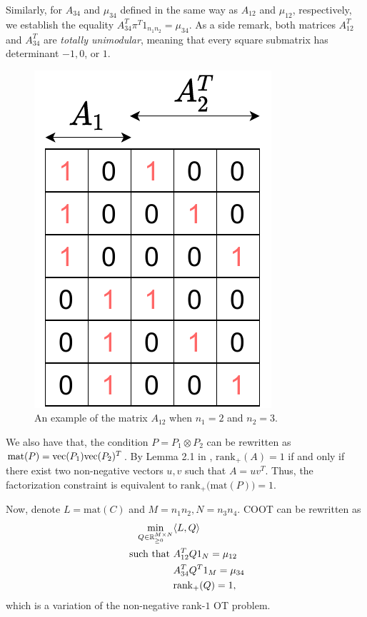 Similarly, for $A_{34}$ and $\mu_{34}$ defined in the same way as $A_{12}$ and
$\mu_{12}$, respectively, we establish the equality $A_{34}^T \pi^T 1_{n_1 n_2} = \mu_{34}$.
As a side remark, both matrices $A_{12}^T$ and $A_{34}^T$ are \textit{totally unimodular},
meaning that every square submatrix has determinant $-1, 0$, or $1$.
\begin{figure}[h]
  \centering
  \includegraphics[height=0.25\textheight,keepaspectratio]{./Chapitre2/fig/matrix.pdf}
  \caption{An example of the matrix $A_{12}$ when $n_1=2$ and $n_2=3$.}
  \label{fig:matrix_a12}
\end{figure}

We also have that, the condition $P = P_1 \otimes P_2$ can be rewritten as
$\text{mat}(P) = \text{vec}(P_1) \text{vec}(P_2)^T$. By Lemma 2.1 in \citep{Joel93}, $\text{rank}_+(A) = 1$
if and only if there exist two non-negative vectors $u,v$ such that
$A = u v^T$. Thus, the factorization constraint is equivalent to
$\text{rank}_+\big( \text{mat}(P) \big) = 1$.

Now, denote $L= \text{mat}(C)$ and $M = n_1 n_2, N = n_3 n_4$. COOT can be rewritten as
\begin{equation*}
  \begin{split}
    \min_{Q \in \mathbb R^{M \times N}_{\geq 0}} &\langle L, Q \rangle \\
    \text{ such that } & A_{12}^T Q 1_N = \mu_{12} \\
    &A_{34}^T Q^T 1_M = \mu_{34} \\
    &\text{rank}_{+}(Q) = 1,
  \end{split}
\end{equation*}
which is a variation of the non-negative rank-$1$ OT problem.

